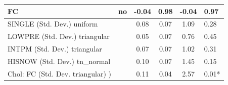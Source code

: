 \begin{table}
\begin{center}
\begin{tabular}{|l|l|c|c|c|l|}
			\hline
			FC & no & -0.04 & 0.98 & -0.04 & 0.97 \\
			\hline
			SINGLE (Std. Dev.) uniform &  & 0.08 & 0.07 & 1.09 & 0.28 \\
			\hline
			LOWPRE (Std. Dev.) triangular &  & 0.05 & 0.07 & 0.76 & 0.45 \\
			\hline
			INTPM (Std. Dev.) triangular &  & 0.07 & 0.07 & 1.02 & 0.31 \\
			\hline
			HISNOW (Std. Dev.) tn_normal &  & 0.10 & 0.07 & 1.45 & 0.15 \\
			\hline
			 Chol: FC (Std. Dev. triangular) ) &  & 0.11 & 0.04 & 2.57 & 0.01* \\
			\hline
		\end{tabular}
	\end{center}
\end{table}